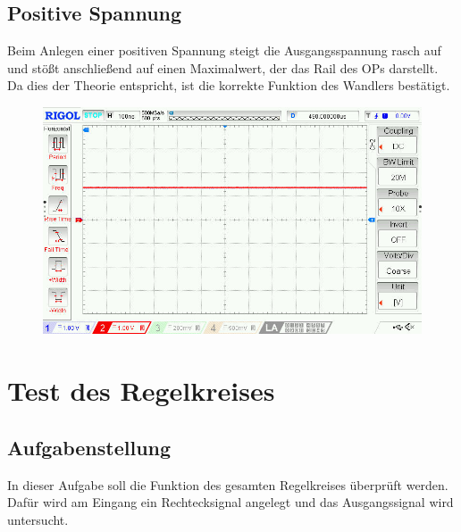 \documentclass[twoside]{article}
\begin{document}
\subsection{Positive Spannung}
Beim Anlegen einer positiven Spannung steigt die Ausgangsspannung rasch auf und stößt anschließend auf einen Maximalwert, der das Rail des OPs darstellt. Da dies der Theorie entspricht, ist die korrekte Funktion des Wandlers bestätigt.
\begin{figure}[h]
    \centering
    \includegraphics[width=1\linewidth]{img/Oszi_01.jpg}
\end{figure}

\newpage
\section{Test des Regelkreises}
\subsection{Aufgabenstellung}
In dieser Aufgabe soll die Funktion des gesamten Regelkreises überprüft werden. Dafür wird am Eingang ein Rechtecksignal angelegt und das Ausgangssignal wird untersucht.
\end{document}
